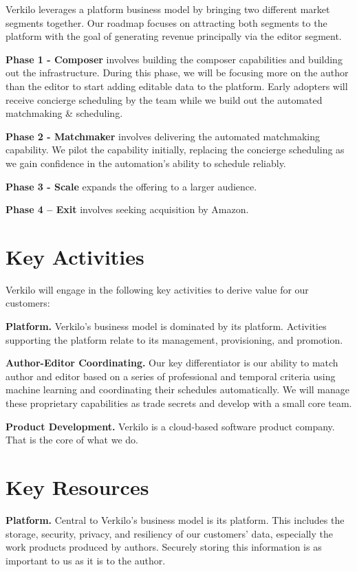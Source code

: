 \documentclass[10pt,openany]{book}
\begin{document}
Verkilo leverages a platform business model by bringing two different
market segments together. Our roadmap focuses on attracting both
segments to the platform with the goal of generating revenue principally
via the editor segment.

\textbf{Phase 1 - Composer} involves building the composer capabilities
and building out the infrastructure. During this phase, we will be
focusing more on the author than the editor to start adding editable
data to the platform. Early adopters will receive concierge scheduling
by the team while we build out the automated matchmaking \& scheduling.

\textbf{Phase 2 - Matchmaker} involves delivering the automated
matchmaking capability. We pilot the capability initially, replacing the
concierge scheduling as we gain confidence in the automation's ability
to schedule reliably.

\textbf{Phase 3 - Scale} expands the offering to a larger audience.

\textbf{Phase 4 -- Exit} involves seeking acquisition by Amazon.

\hypertarget{key-activities}{%
\section{Key Activities}\label{key-activities}}

Verkilo will engage in the following key activities to derive value for
our customers:

\textbf{Platform.} Verkilo's business model is dominated by its
platform. Activities supporting the platform relate to its management,
provisioning, and promotion.

\textbf{Author-Editor Coordinating.} Our key differentiator is our
ability to match author and editor based on a series of professional and
temporal criteria using machine learning and coordinating their
schedules automatically. We will manage these proprietary capabilities
as trade secrets and develop with a small core team.

\textbf{Product Development.} Verkilo is a cloud-based software product
company. That is the core of what we do.

\hypertarget{key-resources}{%
\section{Key Resources}\label{key-resources}}

\textbf{Platform.} Central to Verkilo's business model is its platform.
This includes the storage, security, privacy, and resiliency of our
customers' data, especially the work products produced by authors.
Securely storing this information is as important to us as it is to the
author.
\end{document}
